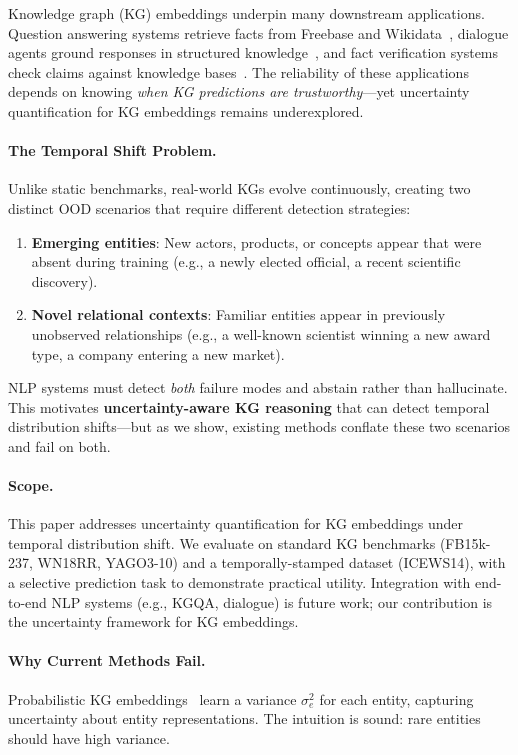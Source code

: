 
Knowledge graph (KG) embeddings underpin many downstream applications.
Question answering systems retrieve facts from Freebase and Wikidata~\citep{bordes2015large}, dialogue agents ground responses in structured knowledge~\citep{moon2019opendialkg}, and fact verification systems check claims against knowledge bases~\citep{thorne2018fever}.
The reliability of these applications depends on knowing \emph{when KG predictions are trustworthy}---yet uncertainty quantification for KG embeddings remains underexplored.

\paragraph{The Temporal Shift Problem.}
Unlike static benchmarks, real-world KGs evolve continuously, creating two distinct OOD scenarios that require different detection strategies:
\begin{enumerate}
    \item \textbf{Emerging entities}: New actors, products, or concepts appear that were absent during training (e.g., a newly elected official, a recent scientific discovery).
    \item \textbf{Novel relational contexts}: Familiar entities appear in previously unobserved relationships (e.g., a well-known scientist winning a new award type, a company entering a new market).
\end{enumerate}
NLP systems must detect \emph{both} failure modes and abstain rather than hallucinate.
This motivates \textbf{uncertainty-aware KG reasoning} that can detect temporal distribution shifts---but as we show, existing methods conflate these two scenarios and fail on both.

\paragraph{Scope.}
This paper addresses uncertainty quantification for KG embeddings under temporal distribution shift.
We evaluate on standard KG benchmarks (FB15k-237, WN18RR, YAGO3-10) and a temporally-stamped dataset (ICEWS14), with a selective prediction task to demonstrate practical utility.
Integration with end-to-end NLP systems (e.g., KGQA, dialogue) is future work; our contribution is the uncertainty framework for KG embeddings.

\paragraph{Why Current Methods Fail.}
Probabilistic KG embeddings~\citep{Chen2021PERM,chen2021probabilistic} learn a variance $\sigma^2_e$ for each entity, capturing uncertainty about entity representations.
The intuition is sound: rare entities should have high variance.

